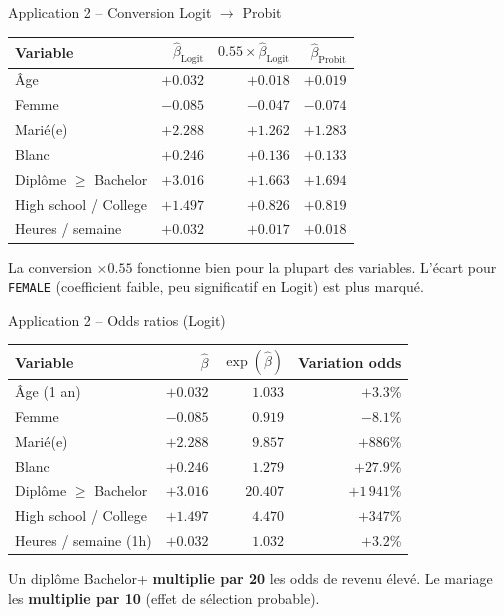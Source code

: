\documentclass[11pt,aspectratio=169]{beamer}
\begin{document}
\begin{frame}{Application 2 -- Conversion Logit $\to$ Probit}

\begin{center}
    \small
    \renewcommand{\arraystretch}{1.2}
    \begin{tabular}{lrrr}
        \toprule
        \textbf{Variable} & $\hat\beta_{\text{Logit}}$ & $0.55 \times \hat\beta_{\text{Logit}}$ & $\hat\beta_{\text{Probit}}$ \\
        \midrule
        Âge & $+0.032$ & $+0.018$ & $+0.019$ \\
        Femme & $-0.085$ & $-0.047$ & $-0.074$ \\
        Marié(e) & $+2.288$ & $+1.262$ & $+1.283$ \\
        Blanc & $+0.246$ & $+0.136$ & $+0.133$ \\
        Diplôme $\geq$ Bachelor & $+3.016$ & $+1.663$ & $+1.694$ \\
        High school / College & $+1.497$ & $+0.826$ & $+0.819$ \\
        Heures / semaine & $+0.032$ & $+0.017$ & $+0.018$ \\
        \bottomrule
    \end{tabular}
\end{center}

La conversion $\times 0.55$ fonctionne bien pour la plupart des
variables. L'écart pour \texttt{FEMALE} (coefficient faible, peu
significatif en Logit) est plus marqué.

\end{frame}

\begin{frame}{Application 2 -- Odds ratios (Logit)}

\begin{center}
    \small
    \renewcommand{\arraystretch}{1.3}
    \begin{tabular}{lrrr}
        \toprule
        \textbf{Variable} & $\hat{\beta}$ & $\exp(\hat{\beta})$ & \textbf{Variation odds} \\
        \midrule
        Âge (1 an) & $+0.032$ & $1.033$ & $+3.3$\% \\
        Femme & $-0.085$ & $0.919$ & $-8.1$\% \\
        Marié(e) & $+2.288$ & $9.857$ & $+886$\% \\
        Blanc & $+0.246$ & $1.279$ & $+27.9$\% \\
        Diplôme $\geq$ Bachelor & $+3.016$ & $20.407$ & $+1\,941$\% \\
        High school / College & $+1.497$ & $4.470$ & $+347$\% \\
        Heures / semaine (1h) & $+0.032$ & $1.032$ & $+3.2$\% \\
        \bottomrule
    \end{tabular}
\end{center}

Un diplôme Bachelor+ \textbf{multiplie par 20} les odds de revenu élevé.
Le mariage les \textbf{multiplie par 10} (effet de sélection probable).

\end{frame}
\end{document}
